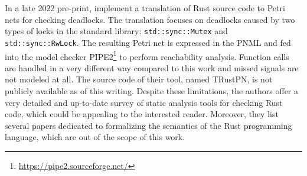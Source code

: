 \documentclass[../Thesis.tex]{subfiles}
\begin{document}
In a late 2022 pre-print, \cite{zhang2022deadlocks} implement a translation
of Rust source code to Petri nets for checking deadlocks.
The translation focuses on deadlocks caused by two types of locks
in the standard library: \texttt{std::sync::Mutex} and \texttt{std::sync::RwLock}.
The resulting Petri net is expressed in the \acrfull{PNML}
and fed into the model checker \acrfull{PIPE2}\footnote{\url{https://pipe2.sourceforge.net/}}
to perform reachability analysis.
Function calls are handled in a very different way compared to this work and
missed signals are not modeled at all.
The source code of their tool, named TRustPN, is not publicly available as of this writing.
Despite these limitations, the authors offer a very detailed and up-to-date survey
of static analysis tools for checking Rust code,
which could be appealing to the interested reader.
Moreover, they list several papers dedicated to
formalizing the semantics of the Rust programming language,
which are out of the scope of this work.
\end{document}
